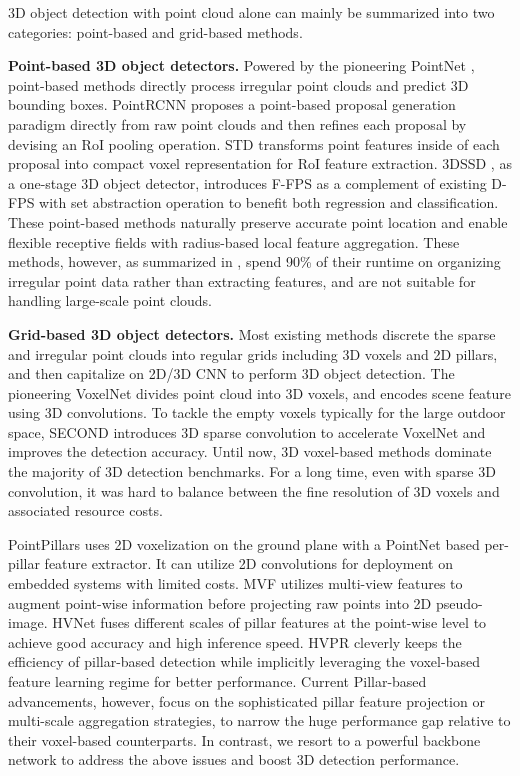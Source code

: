 \documentclass[runningheads]{llncs}
\begin{document}
3D object detection with point cloud alone can mainly be summarized into two categories: point-based and grid-based methods.

{\flushleft \bf Point-based 3D object detectors.}
Powered by the pioneering PointNet \cite{qi2017pointnet,qi2017pointnet++}, point-based methods directly process irregular point clouds and predict 3D bounding boxes.
PointRCNN \cite{shi2019pointrcnn} proposes a point-based proposal generation paradigm directly from raw point clouds and then refines each proposal by devising an RoI pooling operation. 
STD \cite{yang2019std} transforms point features inside of each proposal into compact voxel representation for RoI feature extraction.
3DSSD \cite{liu2016ssd}, as a one-stage 3D object detector, introduces F-FPS as a complement of existing D-FPS with set abstraction operation to benefit both regression and classification.
These point-based methods naturally preserve accurate point location and enable flexible receptive fields with radius-based local feature aggregation. These methods, however, as summarized in \cite{liu2019point}, spend 90\% of their runtime on organizing irregular point data rather than extracting features, and are not suitable for handling large-scale point clouds.

{\flushleft \bf Grid-based 3D object detectors.}
Most existing methods discrete the sparse and irregular point clouds into regular grids including 3D voxels and 2D pillars, and then capitalize on 2D/3D CNN to perform 3D object detection.
The pioneering VoxelNet \cite{zhou2018voxelnet} divides point cloud into 3D voxels, and encodes scene feature using 3D convolutions.
To tackle the empty voxels typically for the large outdoor space, SECOND \cite{yan2018second} introduces 3D sparse convolution to accelerate VoxelNet \cite{zhou2018voxelnet} and improves the detection accuracy. 
Until now, 3D voxel-based methods dominate the majority of 3D detection benchmarks. 
For a long time, even with sparse 3D convolution, it was hard to balance between the fine resolution of 3D voxels and associated resource costs.

PointPillars \cite{lang2019pointpillars} uses 2D voxelization on the ground plane with a PointNet \cite{qi2017pointnet} based per-pillar feature extractor. It can utilize 2D convolutions for deployment on embedded systems with limited costs.
MVF \cite{chen2017multi} utilizes multi-view features to augment point-wise information before projecting raw points into 2D pseudo-image. 
HVNet \cite{ye2020hvnet} fuses different scales of pillar features at the point-wise level to achieve good accuracy and high inference speed.
HVPR\cite{noh2021hvpr} cleverly keeps the efficiency of pillar-based detection while implicitly leveraging the voxel-based feature learning regime  for better performance.
Current Pillar-based advancements, however, focus on the sophisticated pillar feature projection or multi-scale aggregation strategies, to narrow the huge performance gap relative to their voxel-based counterparts.
In contrast, we resort to a powerful backbone network to address the above issues and boost 3D detection performance.
\end{document}
